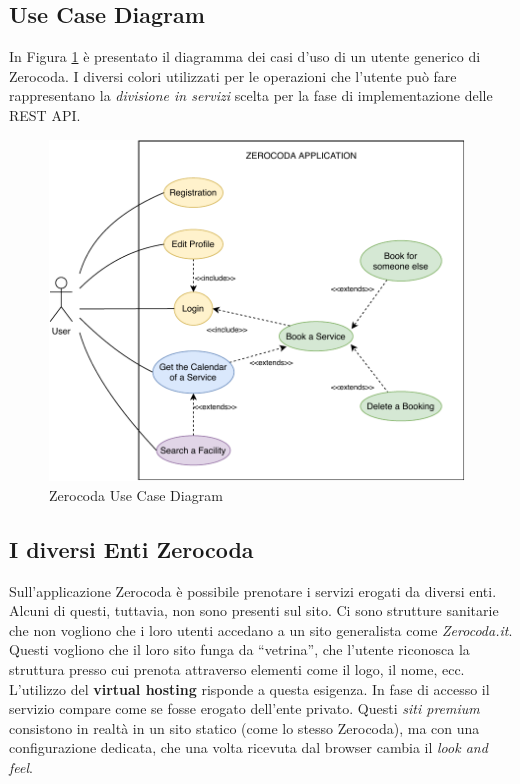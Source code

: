 \subsection{Use Case Diagram}
In Figura \ref{fig:zerocodausecase} è presentato il diagramma dei casi d'uso di un utente generico di Zerocoda. I diversi colori utilizzati per le operazioni che l'utente può fare rappresentano la \textit{divisione in servizi} scelta per la fase di implementazione delle REST API.
\begin{figure}[H]
    \centering
    \includegraphics[width=0.98\textwidth]{images/02_1_zerocoda_usecase.pdf}
    \caption{Zerocoda Use Case Diagram}
    \label{fig:zerocodausecase}
\end{figure}

\subsection{I diversi Enti Zerocoda}
Sull'applicazione Zerocoda è possibile prenotare i servizi erogati da diversi enti. Alcuni di questi, tuttavia, non sono presenti sul sito. Ci sono strutture sanitarie che non vogliono che i loro utenti accedano a un sito generalista come \emph{Zerocoda.it}. Questi vogliono che il loro sito funga da ``vetrina'', che l'utente riconosca la struttura presso cui prenota attraverso elementi come il logo, il nome, ecc. L'utilizzo del \textbf{virtual hosting} risponde a questa esigenza. In fase di accesso il servizio compare come se fosse erogato dell’ente privato. Questi \textit{siti premium} consistono in realtà in un sito statico (come lo stesso Zerocoda), ma con una configurazione dedicata, che una volta ricevuta dal browser cambia il \emph{look and feel}.

